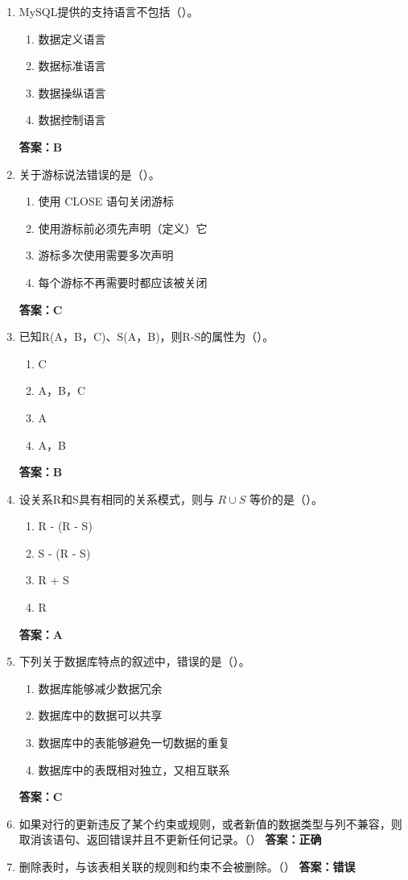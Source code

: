 \documentclass[12pt, a4paper]{article}
\begin{document}
\begin{enumerate}[label=\arabic*.]
	\item MySQL提供的支持语言不包括（\quad）。
	      \begin{enumerate}
		      \item 数据定义语言
		      \item 数据标准语言
		      \item 数据操纵语言
		      \item 数据控制语言
	      \end{enumerate}
	      \textbf{答案：B}

	\item 关于游标说法错误的是（\quad）。
	      \begin{enumerate}
		      \item 使用 CLOSE 语句关闭游标
		      \item 使用游标前必须先声明（定义）它
		      \item 游标多次使用需要多次声明
		      \item 每个游标不再需要时都应该被关闭
	      \end{enumerate}
	      \textbf{答案：C}

	\item 已知R(A，B，C)、S(A，B)，则R-S的属性为（\quad）。
	      \begin{enumerate}
		      \item C
		      \item A，B，C
		      \item A
		      \item A，B
	      \end{enumerate}
	      \textbf{答案：B}

	\item 设关系R和S具有相同的关系模式，则与 $R \cup S$ 等价的是（\quad）。
	      \begin{enumerate}
		      \item R - (R - S)
		      \item S - (R - S)
		      \item R + S
		      \item R
	      \end{enumerate}
	      \textbf{答案：A}

	\item 下列关于数据库特点的叙述中，错误的是（\quad）。
	      \begin{enumerate}
		      \item 数据库能够减少数据冗余
		      \item 数据库中的数据可以共享
		      \item 数据库中的表能够避免一切数据的重复
		      \item 数据库中的表既相对独立，又相互联系
	      \end{enumerate}
	      \textbf{答案：C}

	\item 如果对行的更新违反了某个约束或规则，或者新值的数据类型与列不兼容，则取消该语句、返回错误并且不更新任何记录。（\quad）
	      \textbf{答案：正确}

	\item 删除表时，与该表相关联的规则和约束不会被删除。（\quad）
	      \textbf{答案：错误}
\end{enumerate}
\end{document}

